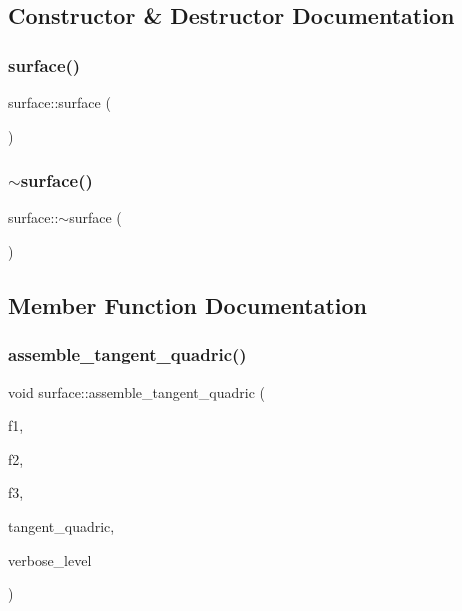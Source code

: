 \subsection{Constructor \& Destructor Documentation}
\mbox{\label{classsurface_ab5fc521a35b0534321d79457e76e0f85}} 
\subsubsection{\texorpdfstring{surface()}{surface()}}
{\footnotesize\ttfamily surface\+::surface (\begin{DoxyParamCaption}{ }\end{DoxyParamCaption})}

\mbox{\label{classsurface_a0d468eb3f6583074c61925c838ab7e42}} 
\subsubsection{\texorpdfstring{$\sim$surface()}{~surface()}}
{\footnotesize\ttfamily surface\+::$\sim$surface (\begin{DoxyParamCaption}{ }\end{DoxyParamCaption})}



\subsection{Member Function Documentation}
\mbox{\label{classsurface_ae14b94847bf8bd92bc6af58b31884cdc}} 
\subsubsection{\texorpdfstring{assemble\+\_\+tangent\+\_\+quadric()}{assemble\_tangent\_quadric()}}
{\footnotesize\ttfamily void surface\+::assemble\+\_\+tangent\+\_\+quadric (\begin{DoxyParamCaption}\item[{\mbox{\hyperlink{galois_8h_a09fddde158a3a20bd2dcadb609de11dc}{I\+NT}} $\ast$}]{f1,  }\item[{\mbox{\hyperlink{galois_8h_a09fddde158a3a20bd2dcadb609de11dc}{I\+NT}} $\ast$}]{f2,  }\item[{\mbox{\hyperlink{galois_8h_a09fddde158a3a20bd2dcadb609de11dc}{I\+NT}} $\ast$}]{f3,  }\item[{\mbox{\hyperlink{galois_8h_a09fddde158a3a20bd2dcadb609de11dc}{I\+NT}} $\ast$\&}]{tangent\+\_\+quadric,  }\item[{\mbox{\hyperlink{galois_8h_a09fddde158a3a20bd2dcadb609de11dc}{I\+NT}}}]{verbose\+\_\+level }\end{DoxyParamCaption})}

